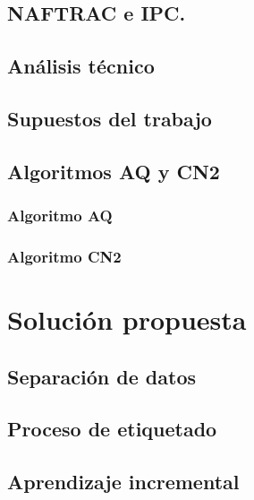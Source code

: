 \documentclass[onesided, 12pt]{scrbook}
\theoremstyle{break}
\begin{document}
\section{NAFTRAC e IPC.}
\label{seccion:naftrac}

\section{Análisis técnico}
\label{seccion:analisisTecnico}

\section{Supuestos del trabajo}
\label{seccion:supuestos}


\section{Algoritmos AQ y CN2}
\label{seccion:algoritmos aq cn2}

\subsection{Algoritmo AQ}
\label{subseccion:algoritmo aq}

\subsection{Algoritmo CN2}
\label{subseccion:algoritmo cn2}

\chapter{Solución propuesta}
\label{capitulo:solucion propuesta}

\section{Separación de datos}
\label{seccion:separacion de datos}

\section{Proceso de etiquetado}
\label{seccion:proceso etiquetado}

\section{Aprendizaje incremental}
\label{seccion:aprendizaje incremental}
\end{document}
